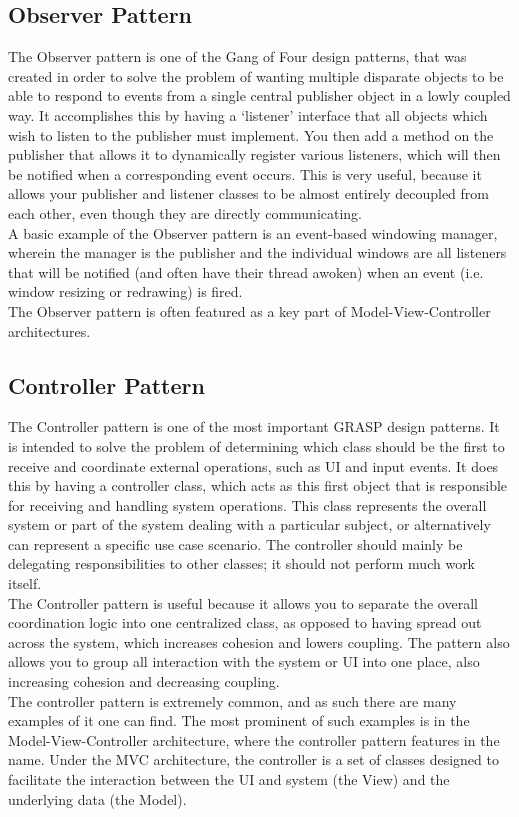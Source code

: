 \documentclass{article}
\begin{document}
    \subsection{Observer Pattern}
    The Observer pattern is one of the Gang of Four design patterns, that was
    created in order to solve the problem of wanting multiple disparate objects
    to be able to respond to events from a single central publisher object in a
    lowly coupled way. It accomplishes this by having a `listener' interface
    that all objects which wish to listen to the publisher must implement. You
    then add a method on the publisher that allows it to dynamically register
    various listeners, which will then be notified when a corresponding event
    occurs.  This is very useful, because it allows your publisher and listener
    classes to be almost entirely decoupled from each other, even though they
    are directly communicating.\\
    A basic example of the Observer pattern is an event-based windowing manager,
    wherein the manager is the publisher and the individual windows are all
    listeners that will be notified (and often have their thread awoken) when an
    event (i.e. window resizing or redrawing) is fired.\\
    The Observer pattern is often featured as a key part of
    Model-View-Controller architectures.
    \newpage
    \subsection{Controller Pattern}
    The Controller pattern is one of the most important GRASP design patterns.
    It is intended to solve the problem of determining which class should be the
    first to receive and coordinate external operations, such as UI and input
    events. It does this by having a controller class, which acts as this first
    object that is responsible for receiving and handling system operations.
    This class represents the overall system or part of the system dealing with
    a particular subject, or alternatively can represent a specific use case
    scenario. The controller should mainly be delegating responsibilities to
    other classes; it should not perform much work itself.\\
    The Controller pattern is useful because it allows you to separate the
    overall coordination logic into one centralized class, as opposed to having
    spread out across the system, which increases cohesion and lowers coupling.
    The pattern also allows you to group all interaction with the system or UI
    into one place, also increasing cohesion and decreasing coupling.\\
    The controller pattern is extremely common, and as such there are many
    examples of it one can find. The most prominent of such examples is in the
    Model-View-Controller architecture, where the controller pattern features in
    the name. Under the MVC architecture, the controller is a set of classes
    designed to facilitate the interaction between the UI and system (the View)
    and the underlying data (the Model).
    \newpage
\end{document}
